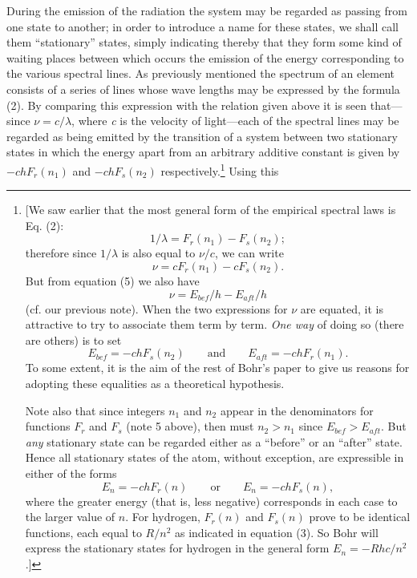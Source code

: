 During the emission of the radiation the system may be regarded as
passing from one state to another; in order to introduce a name for
these states, we shall call them ``stationary'' states, simply
indicating thereby that they form some kind of waiting places between
which occurs the emission of the energy corresponding to the various
spectral lines. As previously mentioned the spectrum of an element
consists of a series of lines whose wave lengths may be expressed by the
formula (2). By comparing this expression with the relation given above
it is seen that---since $\nu = c/\lambda$, where \emph{c} is the
velocity of light---each of the spectral lines may be regarded as being
emitted by the transition of a system between two stationary states in
which the energy apart from an arbitrary additive constant is given by
$-chF_r(n_1)$ and $-chF_s(n_2)$
respectively.\footnote{{[}We saw earlier that the most general form of
  the empirical spectral laws is Eq. (2):
  \begin{equation*}
  1/\lambda = F_r(n_1) - F_s(n_2) ;
  \end{equation*}
  therefore since $1/\lambda$ is also equal to $\nu/c$, we can write
  \begin{equation*}
  \nu = cF_r(n_1) - cF_s(n_2) .
  \end{equation*}
  But from equation (5) we also have
  \begin{equation*}
  \nu = E_{bef}/h - E_{aft}/h
  \end{equation*}
  (cf. our previous note). When the two expressions for $\nu$ are
  equated, it is attractive to try to associate them term by term.
  \emph{One way} of doing so (there are others) is to set
  \begin{equation*}
  E_{bef} = - chF_s(n_2) \quad\quad \text{and} \quad\quad E_{aft} = -chF_r(n_1) .
  \end{equation*}
  To some extent, it is the aim of the rest of Bohr's paper to give us
  reasons for adopting these equalities as a theoretical hypothesis.

  Note also that since integers $n_1$ and $n_2$ appear in the
  denominators for functions $F_r$ and $F_s$ (note 5
  above), then must $n_2 > n_1$ since $E_{bef} > E_{aft}$. But \emph{any} 
  stationary state can be
  regarded either as a ``before'' or an ``after'' state. Hence all
  stationary states of the atom, without exception, are expressible in
  either of the forms
  \begin{equation*}
  E_n = -chF_r(n) \quad\quad \text{or} \quad\quad E_n = -chF_s(n) ,
  \end{equation*}
  where the greater energy (that is, less negative) corresponds in each
  case to the larger value of $n$. For hydrogen,
  $F_r(n)$ and $F_s(n)$ prove to be identical
  functions, each equal to $R/n^2$ as indicated in equation (3).
  So Bohr will express the stationary states for hydrogen
  in the general form $E_n = -Rhc/n^2$ .{]}} Using this
